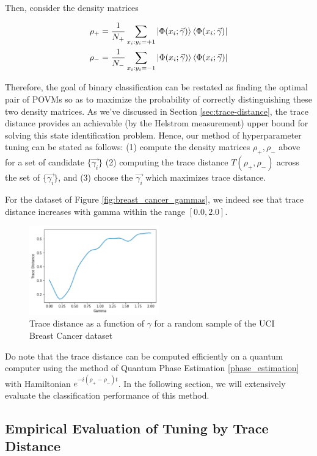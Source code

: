 \documentclass[main.tex]{subfiles}
\begin{document}
Then, consider the density matrices

\begin{align*}
\rho_+ &= \frac{1}{N_+} \sum_{x_i : y_i = +1} \ket{\Phi(x_i; \vec{\gamma})}\bra{\Phi(x_i; \vec{\gamma})}	\\
\rho_- &= \frac{1}{N_-} \sum_{x_i : y_i = -1} \ket{\Phi(x_i; \vec{\gamma})}\bra{\Phi(x_i; \vec{\gamma})}	
\end{align*}

Therefore, the goal of binary classification can be restated as finding the optimal pair of POVMs so as to maximize the probability of correctly distinguishing these two density matrices. As we've discussed in Section \ref{sec:trace-distance}, the trace distance provides an achievable (by the Helstrom measurement) upper bound for solving this state identification problem. Hence, our method of hyperparameter tuning can be stated as follows: (1) compute the density matrices $\rho_+, \rho_-$ above for a set of candidate $\{ \vec{\gamma_i} \}$ (2) computing the trace distance $T(\rho_+, \rho_-)$ across the set of $\{ \vec{\gamma_i} \}$, and (3) choose the $\vec{\gamma_i}$ which maximizes trace distance. 

For the dataset of Figure \ref{fig:breast_cancer_gammas}, we indeed see that trace distance increases with gamma within the range $[0.0, 2.0]$.

\begin{figure}[H]
\centering
\includegraphics[width=0.5\textwidth]{images/linear_trace_distance}	
\caption{Trace distance as a function of $\gamma$ for a random sample of the UCI Breast Cancer dataset}
\end{figure}

Do note that the trace distance can be computed efficiently on a quantum computer using the method of Quantum Phase Estimation \ref{phase_estimation} with Hamiltonian $e^{-i (\rho_+ - \rho_-)t}$. In the following section, we will extensively evaluate the classification performance of this method.

\subsection{Empirical Evaluation of Tuning by Trace Distance}
\end{document}
